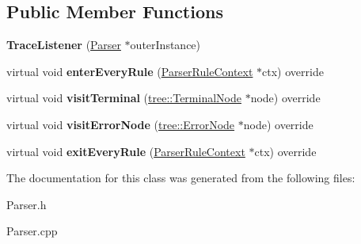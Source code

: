 \subsection*{Public Member Functions}
\begin{DoxyCompactItemize}
\item 
\mbox{\label{classantlr4_1_1Parser_1_1TraceListener_ad26708bac7bd2e56767f7ad1688d46cc}} 
{\bfseries Trace\+Listener} (\hyperlink{classantlr4_1_1Parser}{Parser} $\ast$outer\+Instance)
\item 
\mbox{\label{classantlr4_1_1Parser_1_1TraceListener_a6cdaf85d7756e1a44d9a5f652084134e}} 
virtual void {\bfseries enter\+Every\+Rule} (\hyperlink{classantlr4_1_1ParserRuleContext}{Parser\+Rule\+Context} $\ast$ctx) override
\item 
\mbox{\label{classantlr4_1_1Parser_1_1TraceListener_aaf4fde6bf202b0cadce5441e7c43be9b}} 
virtual void {\bfseries visit\+Terminal} (\hyperlink{classantlr4_1_1tree_1_1TerminalNode}{tree\+::\+Terminal\+Node} $\ast$node) override
\item 
\mbox{\label{classantlr4_1_1Parser_1_1TraceListener_abc04c53068808fdfcc7eec39d14f5eec}} 
virtual void {\bfseries visit\+Error\+Node} (\hyperlink{classantlr4_1_1tree_1_1ErrorNode}{tree\+::\+Error\+Node} $\ast$node) override
\item 
\mbox{\label{classantlr4_1_1Parser_1_1TraceListener_a1e95b9af3718f4701036066468bb9111}} 
virtual void {\bfseries exit\+Every\+Rule} (\hyperlink{classantlr4_1_1ParserRuleContext}{Parser\+Rule\+Context} $\ast$ctx) override
\end{DoxyCompactItemize}


The documentation for this class was generated from the following files\+:\begin{DoxyCompactItemize}
\item 
Parser.\+h\item 
Parser.\+cpp\end{DoxyCompactItemize}
